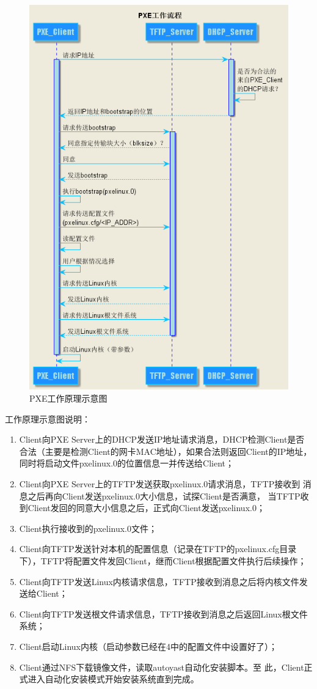 \begin{figure}[hbtp]
\centering
\includegraphics[width=.8\textwidth]{img/pxe01.png}
\caption{PXE工作原理示意图}
\end{figure}

工作原理示意图说明：
\begin{enumerate}[itemsep=0pt,parsep=0pt]
\item Client向PXE Server上的DHCP发送IP地址请求消息，DHCP检测Client是否
  合法（主要是检测Client的网卡MAC地址），如果合法则返回Client的IP地址，
  同时将启动文件pxelinux.0的位置信息一并传送给Client；
\item Client向PXE Server上的TFTP发送获取pxelinux.0请求消息，TFTP接收到
  消息之后再向Client发送pxelinux.0大小信息，试探Client是否满意，
  当TFTP收到Client发回的同意大小信息之后，正式向Client发送pxelinux.0；
\item Client执行接收到的pxelinux.0文件；
\item Client向TFTP发送针对本机的配置信息（记录在TFTP的pxelinux.cfg目录
  下），TFTP将配置文件发回Client，继而Client根据配置文件执行后续操作；
\item Client向TFTP发送Linux内核请求信息，TFTP接收到消息之后将内核文件发
  送给Client；
\item Client向TFTP发送根文件请求信息，TFTP接收到消息之后返回Linux根文件
  系统；
\item Client启动Linux内核（启动参数已经在4中的配置文件中设置好了）；
\item Client通过NFS下载镜像文件，读取autoyast自动化安装脚本。至
  此，Client正式进入自动化安装模式开始安装系统直到完成。
\end{enumerate}

